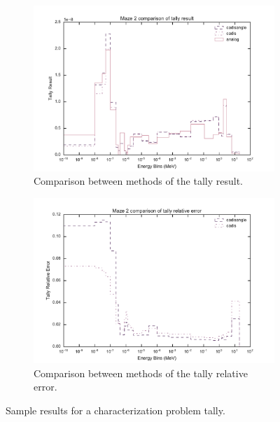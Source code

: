 \begin{figure}[ht!]
  \centering
  \begin{subfigure}[t]{\textwidth}
    \centering
    \includegraphics[width=0.8\linewidth]{./chapters/characterization_probs/figures/char/maze2/maze_2_tally_result_compare.pdf}
    \caption{Comparison between methods of the tally result.}
    \label{fig:sampleresult}
  \end{subfigure}
  \begin{subfigure}[t]{\textwidth}
    \centering
    \includegraphics[width=0.8\linewidth]{./chapters/characterization_probs/figures/char/maze2/maze_2_tally_error_compare.pdf}
    \caption{Comparison between methods of the tally relative error.}
    \label{fig:sampleerror}
  \end{subfigure}
  \caption[Sample results for a characterization problem tally.]{Sample results
  for a characterization problem tally.}
\end{figure}

